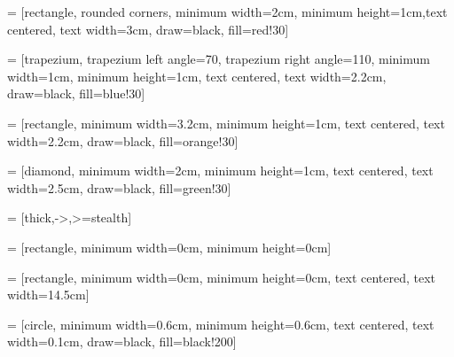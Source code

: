 %
%
%
%
% 



\usepackage{tikz}
\usetikzlibrary{shapes.geometric, arrows}

 = [rectangle, rounded corners, minimum width=2cm, minimum height=1cm,text centered, text width=3cm, draw=black, fill=red!30] 

 = [trapezium, trapezium left angle=70, trapezium right angle=110, minimum width=1cm, minimum height=1cm, text centered, text width=2.2cm, draw=black, fill=blue!30]

 = [rectangle, minimum width=3.2cm, minimum height=1cm, text centered, text width=2.2cm, draw=black, fill=orange!30]

 = [diamond, minimum width=2cm, minimum height=1cm, text centered, text width=2.5cm, draw=black, fill=green!30]

 = [thick,->,>=stealth]

 = [rectangle, minimum width=0cm, minimum height=0cm]

 = [rectangle, minimum width=0cm, minimum height=0cm, text centered, text width=14.5cm]

 = [circle, minimum width=0.6cm, minimum height=0.6cm, text centered, text width=0.1cm, draw=black, fill=black!200]



\frontmatter
\pagestyle{empty} %



\pagestyle{fancy} %
\tableofcontents


